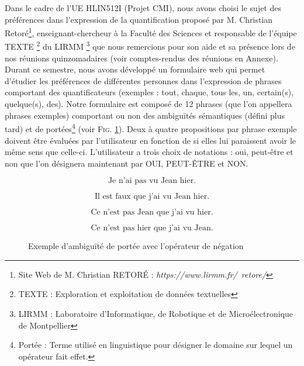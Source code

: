 \documentclass[11pt,letterpaper]{article}
\begin{document}
\vspace{5px}

Dans le cadre de l'UE HLIN512I (Projet CMI), nous avons choisi le sujet  des préférences dans l’expression de la quantification\fg{} proposé par M. Christian Retoré\footnote{Site Web de M. Christian RETORÉ : \textit{https://www.lirmm.fr/~retore/}}, enseignant-chercheur à la Faculté des Sciences et responsable de l'équipe TEXTE \footnote{TEXTE : Exploration et exploitation de données textuelles} du LIRMM \footnote{LIRMM : Laboratoire d'Informatique, de Robotique et de Microélectronique de Montpellier} que nous remercions pour son aide et sa présence lors de nos réunions quinzomadaires (voir comptes-rendus des réunions en Annexe).\\

Durant ce semestre, nous avons développé un formulaire web qui permet d'étudier les préférences de différentes personnes dans l'expression de phrases comportant des quantificateurs (exemples : \og tout\fg{}, \og chaque\fg{}, \og tous les\fg{}, \og un\fg{}, \og certain(s)\fg{}, \og quelque(s)\fg{}, \og des\fg{}). Notre formulaire est composé de 12 phrases (que l'on appellera phrases exemples) comportant ou non des ambiguïtés sémantiques (défini plus tard) et de portées\footnote{Portée : Terme utilisé en linguistique pour désigner le domaine sur lequel un opérateur fait effet.} (voir \textsc{Fig. \ref{fig:vu}}). Deux à quatre propositions par phrase exemple doivent être évaluées par l'utilisateur en fonction de si elles lui paraissent avoir le même sens que celle-ci. L'utilisateur a trois choix de notations : \og oui\fg{}, \og peut-être\fg{} et \og non\fg{} que l'on désignera maintenant par OUI, PEUT-ÊTRE et NON.\\

\vspace{-5px}

\begin{figure}[ht]
\begin{equation}
\text{Je n'ai pas vu Jean hier.}
\label{vu1}
\end{equation}

\vspace{-17px}

\begin{equation}
\text{Il est faux que j'ai vu Jean hier.}
\label{vu2}
\end{equation}

\vspace{-17px}

\begin{equation}
\text{Ce n'est pas Jean que j'ai vu hier.}
\label{vu3}
\end{equation}

\vspace{-17px}

\begin{equation}
\text{Ce n'est pas hier que j'ai vu Jean.}
\label{vu4}
\end{equation}
\caption{Exemple d'ambiguïté de portée avec l'opérateur de négation}
\label{fig:vu}
\end{figure}
\end{document}
